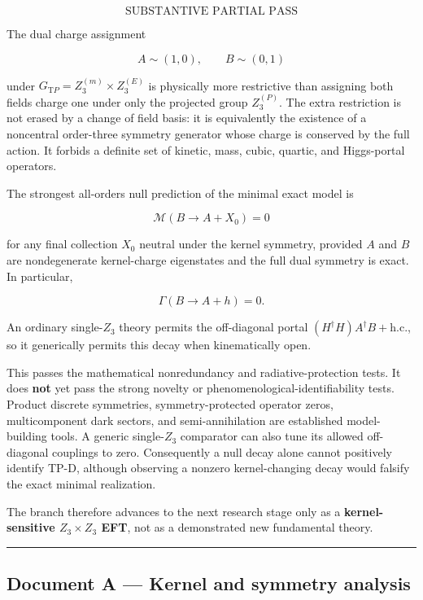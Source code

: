 \documentclass[
]{article}
\begin{document}
\[
\boxed{\text{SUBSTANTIVE PARTIAL PASS}}
\]

The dual charge assignment

\[
A\sim(1,0),\qquad B\sim(0,1)
\]

under \(G_{\mathrm TP}=Z_3^{(m)}\times Z_3^{(E)}\) is physically more
restrictive than assigning both fields charge one under only the
projected group \(Z_3^{(P)}\). The extra restriction is not erased by a
change of field basis: it is equivalently the existence of a noncentral
order-three symmetry generator whose charge is conserved by the full
action. It forbids a definite set of kinetic, mass, cubic, quartic, and
Higgs-portal operators.

The strongest all-orders null prediction of the minimal exact model is

\[
\boxed{\mathcal M(B\rightarrow A+X_0)=0}
\]

for any final collection \(X_0\) neutral under the kernel symmetry,
provided \(A\) and \(B\) are nondegenerate kernel-charge eigenstates and
the full dual symmetry is exact. In particular,

\[
\boxed{\Gamma(B\rightarrow A+h)=0.}
\]

An ordinary single-\(Z_3\) theory permits the off-diagonal portal
\((H^\dagger H)A^\dagger B+\mathrm{h.c.}\), so it generically permits
this decay when kinematically open.

This passes the mathematical nonredundancy and radiative-protection
tests. It does \textbf{not} yet pass the strong novelty or
phenomenological-identifiability tests. Product discrete symmetries,
symmetry-protected operator zeros, multicomponent dark sectors, and
semi-annihilation are established model-building tools. A generic
single-\(Z_3\) comparator can also tune its allowed off-diagonal
couplings to zero. Consequently a null decay alone cannot positively
identify TP-D, although observing a nonzero kernel-changing decay would
falsify the exact minimal realization.

The branch therefore advances to the next research stage only as a
\textbf{kernel-sensitive \(Z_3\times Z_3\) EFT}, not as a demonstrated
new fundamental theory.

\begin{center}\rule{0.5\linewidth}{0.5pt}\end{center}

\hypertarget{document-a-kernel-and-symmetry-analysis}{%
\subsection{Document A --- Kernel and symmetry
analysis}\label{document-a-kernel-and-symmetry-analysis}}
\end{document}
